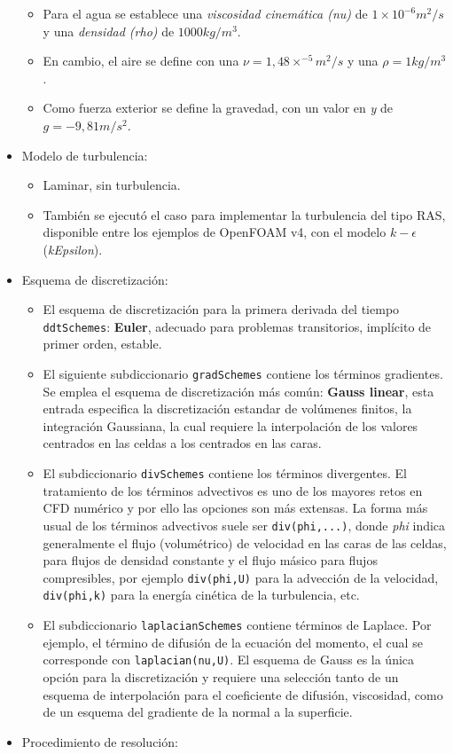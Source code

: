 \begin{itemize}
  \begin{itemize}
  \item
    Para el agua se establece una \emph{viscosidad cinemática (nu)} de
    \(1\times10^{-6} m^2/s\) y una \emph{densidad (rho)} de
    \(1000 kg/m^3\).
  \item
    En cambio, el aire se define con una \(\nu=1,48 \times ^{-5} m^2/s\)
    y una \(\rho=1kg/m^3\).
  \item
    Como fuerza exterior se define la gravedad, con un valor en \emph{y}
    de \(g=-9,81m/s^2\).
  \end{itemize}
\item
  Modelo de turbulencia:

  \begin{itemize}
  \item
    Laminar, sin turbulencia.
  \item
    También se ejecutó el caso para implementar la turbulencia del tipo
    RAS, disponible entre los ejemplos de OpenFOAM v4, con el modelo
    \(k-\epsilon\) (\emph{kEpsilon}).
  \end{itemize}
\item
  Esquema de discretización:

  \begin{itemize}
  \item
    El esquema de discretización para la primera derivada del tiempo
    \texttt{ddtSchemes}: \textbf{Euler}, adecuado para problemas
    transitorios, implícito de primer orden, estable.
  \item
    El siguiente subdiccionario \texttt{gradSchemes} contiene los
    términos gradientes. Se emplea el esquema de discretización más
    común: \textbf{Gauss linear}, esta entrada especifica la
    discretización estandar de volúmenes finitos, la integración
    Gaussiana, la cual requiere la interpolación de los valores
    centrados en las celdas a los centrados en las caras.
  \item
    El subdiccionario \texttt{divSchemes} contiene los términos
    divergentes. El tratamiento de los términos advectivos es uno de los
    mayores retos en CFD numérico y por ello las opciones son más
    extensas. La forma más usual de los términos advectivos suele ser
    \texttt{div(phi,...)}, donde \emph{phi} indica generalmente el flujo
    (volumétrico) de velocidad en las caras de las celdas, para flujos
    de densidad constante y el flujo másico para flujos compresibles,
    por ejemplo \texttt{div(phi,U)} para la advección de la velocidad,
    \texttt{div(phi,k)} para la energía cinética de la turbulencia, etc.
  \item
    El subdiccionario \texttt{laplacianSchemes} contiene términos de
    Laplace. Por ejemplo, el término de difusión de la ecuación del
    momento, el cual se corresponde con \texttt{laplacian(nu,U)}. El
    esquema de Gauss es la única opción para la discretización y
    requiere una selección tanto de un esquema de interpolación para el
    coeficiente de difusión, viscosidad, como de un esquema del
    gradiente de la normal a la superficie.
  \end{itemize}
\item
  Procedimiento de resolución:


\end{itemize}

